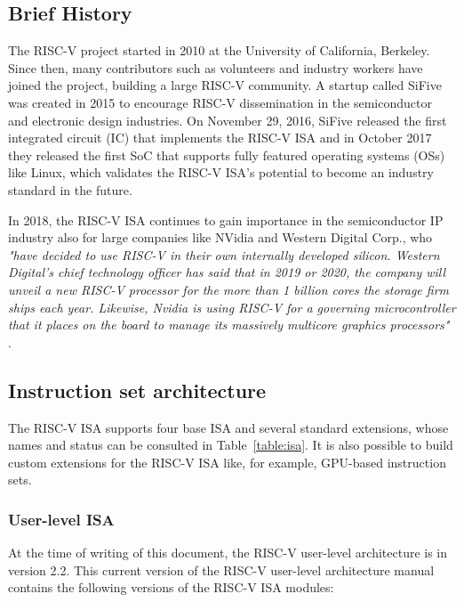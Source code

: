 \subsection{Brief History}

The RISC-V project started in 2010 at the University of California,
Berkeley. Since then, many contributors such as volunteers and industry workers
have joined the project, building a large RISC-V community. A startup called
SiFive was created in 2015 to encourage RISC-V dissemination in the
semiconductor and electronic design industries. On November 29, 2016, SiFive
released the first integrated circuit (IC) that implements the RISC-V ISA and in
October 2017 they released the first SoC that supports fully featured operating
systems (OSs) like Linux, which validates the RISC-V ISA's potential to become
an industry standard in the future.

In 2018, the RISC-V ISA continues to gain importance in the semiconductor IP
industry also for large companies like NVidia and Western Digital Corp., who
\textit{"have decided to use RISC-V in their own internally developed
  silicon. Western Digital's chief technology officer has said that in 2019 or
  2020, the company will unveil a new RISC-V processor for the more than 1
  billion cores the storage firm ships each year. Likewise, Nvidia is using
  RISC-V for a governing microcontroller that it places on the board to manage
  its massively multicore graphics processors"} \cite{bib:opinion}.

\subsection{Instruction set architecture}

The RISC-V ISA supports four base ISA and several standard extensions, whose
names and status can be consulted in Table~\ref{table:isa}. It is also possible
to build custom extensions for the RISC-V ISA like, for example, GPU-based
instruction sets.

\subsubsection{User-level ISA}
\label{subsection:userlevelisa}

At the time of writing of this document, the RISC-V user-level architecture is
in version 2.2. This current version of the RISC-V user-level architecture
manual \cite{bib:riscvmanual} contains the following versions of the RISC-V ISA
modules:

